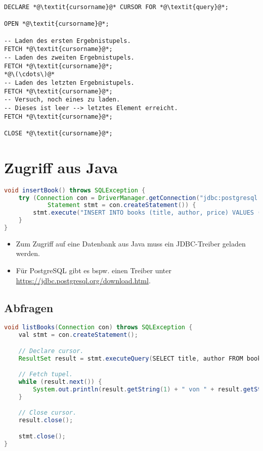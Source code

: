 \documentclass[a4paper, 11pt, accentcolor = tud3b]{tudreport}
\providecommand{\HREF}[1]{\href{#1}{#1}}
\begin{document}
        	\begin{lstlisting}
DECLARE *@\textit{cursorname}@* CURSOR FOR *@\textit{query}@*;

OPEN *@\textit{cursorname}@*;

-- Laden des ersten Ergebnistupels.
FETCH *@\textit{cursorname}@*;
-- Laden des zweiten Ergebnistupels.
FETCH *@\textit{cursorname}@*;
*@\(\cdots\)@*
-- Laden des letzten Ergebnistupels.
FETCH *@\textit{cursorname}@*;
-- Versuch, noch eines zu laden.
-- Dieses ist leer --> letztes Element erreicht.
FETCH *@\textit{cursorname}@*;

CLOSE *@\textit{cursorname}@*;
        	\end{lstlisting}

        \section{Zugriff aus Java} %
            \begin{lstlisting}[language = Java]
void insertBook() throws SQLException {
	try (Connection con = DriverManager.getConnection("jdbc:postgresql://user:password@localhost:3306/library");
			Statement stmt = con.createStatement()) {
		stmt.execute("INSERT INTO books (title, author, price) VALUES ('Java ist auch eine Insel', 'Christian Ullenboom', 4990)");
	}
}
            \end{lstlisting}
            
            \begin{itemize}
            	\item Zum Zugriff auf eine Datenbank aus Java muss ein JDBC-Treiber geladen werden.
            	\item Für PostgreSQL gibt es bspw. einen Treiber unter \HREF{https://jdbc.postgresql.org/download.html}.
            \end{itemize}

            \subsection{Abfragen} %
                \begin{lstlisting}[language = Java]
void listBooks(Connection con) throws SQLException {
	val stmt = con.createStatement();

	// Declare cursor.
	ResultSet result = stmt.executeQuery(SELECT title, author FROM books)

	// Fetch tupel.
	while (result.next()) {
		System.out.println(result.getString(1) + " von " + result.getString(2));
	}

	// Close cursor.
	result.close();

	stmt.close();
}
                \end{lstlisting}
\end{document}
